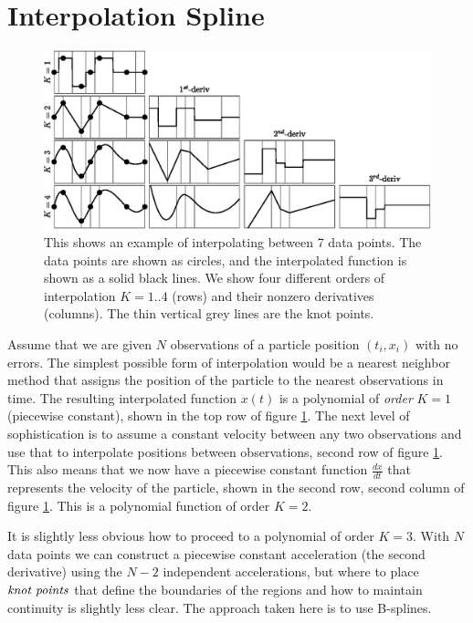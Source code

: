 \documentclass[10pt,journal]{IEEEtran}
\begin{document}
%
\section{Interpolation Spline}
\label{sec:interpolation}
%

\begin{figure}[t]
  \centerline{\includegraphics[width=39pc,angle=0]{figures/interpolation}}
  
  \caption{This shows an example of interpolating between 7 data points. The data points are shown as circles, and the interpolated function is shown as a solid black lines. We show four different orders of interpolation $K=1..4$ (rows) and their nonzero derivatives (columns). The thin vertical grey lines are the knot points.}
  \label{interpolation}
\end{figure}

Assume that we are given $N$ observations of a particle position $(t_i,x_i)$ with no errors. The simplest possible form of interpolation would be a nearest neighbor method that assigns the position of the particle to the nearest observations in time. The resulting interpolated function $x(t)$ is a polynomial of \emph{order} $K=1$ (piecewise constant), shown in the top row of figure \ref{interpolation}. The next level of sophistication is to assume a constant velocity between any two observations and use that to interpolate positions between observations, second row of figure \ref{interpolation}. This also means that we now have a piecewise constant function $\frac{dx}{dt}$ that represents the velocity of the particle, shown in the second row, second column of figure  \ref{interpolation}. This is a polynomial function of order $K=2$.

It is slightly less obvious how to proceed to a polynomial of order $K=3$. With $N$ data points we can construct a piecewise constant acceleration (the second derivative) using the $N-2$ independent accelerations, but where to place $\emph{knot points}$ that define the boundaries of the regions and how to maintain continuity is slightly less clear. The approach taken here is to use B-splines.
\end{document}
